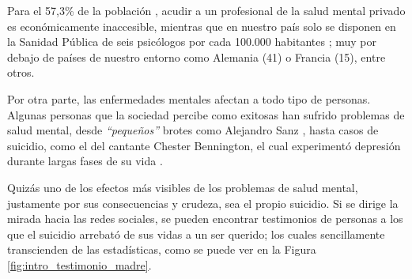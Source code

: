     Para el 57,3\% de la población \cite{confederacion_salud_mental_espana_cuatro_2023}, acudir a un profesional de la salud mental privado es económicamente inaccesible, mientras que en nuestro país solo se disponen en la Sanidad Pública de seis psicólogos por cada 100.000 habitantes \cite{antolin_listas_2023}; muy por debajo de países de nuestro entorno como Alemania (41) o Francia (15), entre otros. 
    
    Por otra parte, las enfermedades mentales afectan a todo tipo de personas. Algunas personas que la sociedad percibe como exitosas han sufrido problemas de salud mental, desde \textit{``pequeños''} brotes como Alejandro Sanz \cite{lopez_chicon_que_2023} \cite{riano_alejandro_2023}, hasta casos de suicidio, como el del cantante Chester Bennington, el cual experimentó depresión durante largas fases de su vida \cite{el_universal_nada_2020} \cite{gambin_historia_2022}.

    Quizás uno de los efectos más visibles de los problemas de salud mental, justamente por sus consecuencias y crudeza, sea el propio suicidio. Si se dirige la mirada hacia las redes sociales, se pueden encontrar testimonios de personas a los que el suicidio arrebató de sus vidas a un ser querido; los cuales sencillamente transcienden de las estadísticas, como se puede ver en la Figura \ref{fig:intro_testimonio_madre}.
    
